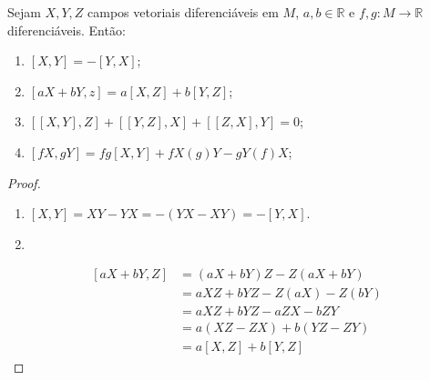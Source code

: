 \begin{proposition}
    \label{loc:5.3_:_prop_8_:_propriedades_dos_colchetes}
    Sejam $X, Y, Z$ campos vetoriais diferenciáveis em $M$, $a, b \in \mathbb{R}$ e $f, g:M\to \mathbb{R}$ diferenciáveis. Então:
    \begin{enumerate}
        \item $[X,Y]=-[Y,X]$;
        \item $[aX+bY, z]=a[X,Z]+b[Y,Z]$;
        \item $[[X,Y],Z]+[[Y,Z],X]+[[Z, X], Y]=0$;
        \item $[fX, gY]=fg[X,Y]+fX(g)Y-gY(f)X$;
    \end{enumerate}
    \begin{proof}

        \begin{enumerate}
            \item $[X,Y] = XY-YX=-(YX - XY)=-[Y, X]$.
            \item \end{enumerate}
        \begin{align*}
            \left[aX+bY,Z\right] & = (aX+bY)Z-Z(aX+bY)    \\
                                 & =aXZ+bYZ-Z(aX)-Z(bY)   \\
                                 & =aXZ + bYZ - aZX - bZY \\
                                 & =a(XZ-ZX)+b(YZ-ZY)     \\
                                 & =a[X, Z] + b[Y, Z]
        \end{align*}


\end{proof}
\end{proposition}
